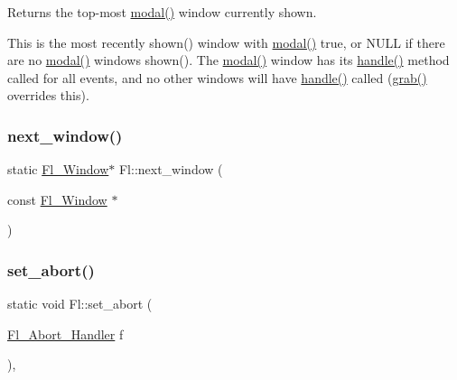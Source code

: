 Returns the top-\/most \hyperlink{group__fl__windows_gaf0938156f04e1babebaa8eb75a8d0fce}{modal()} window currently shown.

This is the most recently shown() window with \hyperlink{group__fl__windows_gaf0938156f04e1babebaa8eb75a8d0fce}{modal()} true, or N\+U\+LL if there are no \hyperlink{group__fl__windows_gaf0938156f04e1babebaa8eb75a8d0fce}{modal()} windows shown(). The \hyperlink{group__fl__windows_gaf0938156f04e1babebaa8eb75a8d0fce}{modal()} window has its \hyperlink{group__fl__events_ga62aea907b7eb34f14adbb8c92b2df221}{handle()} method called for all events, and no other windows will have \hyperlink{group__fl__events_ga62aea907b7eb34f14adbb8c92b2df221}{handle()} called (\hyperlink{group__fl__windows_ga100705a8107397cfde7318aa34019739}{grab()} overrides this). \mbox{\label{group__fl__windows_ga3377fa667615bfa756925d50f98817d1}} 
\subsubsection{\texorpdfstring{next\+\_\+window()}{next\_window()}}
{\footnotesize\ttfamily static \hyperlink{class_fl___window}{Fl\+\_\+\+Window}$\ast$ Fl\+::next\+\_\+window (\begin{DoxyParamCaption}\item[{const \hyperlink{class_fl___window}{Fl\+\_\+\+Window} $\ast$}]{ }\end{DoxyParamCaption})\hspace{0.3cm}{\ttfamily [static]}}

\mbox{\label{group__fl__windows_gaa52e562142bd1e8d5ba6915ff5577245}} 
\subsubsection{\texorpdfstring{set\+\_\+abort()}{set\_abort()}}
{\footnotesize\ttfamily static void Fl\+::set\+\_\+abort (\begin{DoxyParamCaption}\item[{\hyperlink{group__callback__functions_gab06d501e53b8fe82de6d70937fb22f95}{Fl\+\_\+\+Abort\+\_\+\+Handler}}]{f }\end{DoxyParamCaption})\hspace{0.3cm}{\ttfamily [inline]}, {\ttfamily [static]}}

